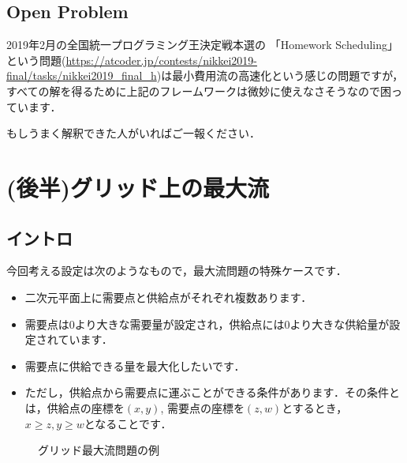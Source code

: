 \documentclass[13pt]{jarticle}
\begin{document}
\subsection{Open Problem}

2019年2月の全国統一プログラミング王決定戦本選の 「Homework Scheduling」という問題({\url{https://atcoder.jp/contests/nikkei2019-final/tasks/nikkei2019_final_h}})は最小費用流の高速化という感じの問題ですが，すべての解を得るために上記のフレームワークは微妙に使えなさそうなので困っています．

もしうまく解釈できた人がいればご一報ください．




\section{(後半)グリッド上の最大流}


\subsection{イントロ}
今回考える設定は次のようなもので，最大流問題の特殊ケースです．
\begin{itemize}
\item 二次元平面上に需要点と供給点がそれぞれ複数あります．
\item 需要点は0より大きな需要量が設定され，供給点には0より大きな供給量が設定されています．
\item 需要点に供給できる量を最大化したいです．
\item ただし，供給点から需要点に運ぶことができる条件があります．その条件とは，供給点の座標を$(x,y)$, 需要点の座標を$(z, w)$とするとき，$x \geq z,  y \geq w$となることです．
\end{itemize}


\begin{figure}[htbp]

\centering
{}
\caption{グリッド最大流問題の例}
\label{2DMF}
\end{figure}
\end{document}
